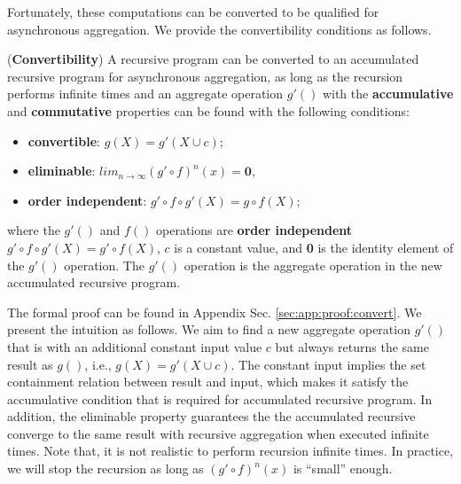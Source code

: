 Fortunately, these computations can be converted to be qualified for asynchronous aggregation. We provide the convertibility conditions as follows.

\begin{theorem}
	\label{th:convert}
	(\textbf{Convertibility}) A recursive program can be converted to an accumulated recursive program for asynchronous aggregation, as long as the recursion performs infinite times and an aggregate operation $g'()$ with the \textbf{accumulative} and \textbf{commutative} properties can be found with the following conditions:
	\begin{itemize}
		\item \textbf{convertible}: $g(X)=g'(X\cup c)$;
		\item \textbf{eliminable}: $lim_{n\rightarrow\infty}(g'\circ f)^n(x)=\textbf{0}$,
\item \textbf{order independent}: $g'\circ f\circ g'(X)=g\circ f(X)$;
	\end{itemize}
	where the $g'()$ and $f()$ operations are \textbf{order independent} $g'\circ f\circ g'(X)=g'\circ f(X)$, $c$ is a constant value, and \textbf{0} is the identity element of the $g'()$ operation. The $g'()$ operation is the aggregate operation in the new accumulated recursive program.
\end{theorem}

The formal proof can be found in Appendix Sec. \ref{sec:app:proof:convert}. We present the intuition as follows. We aim to find a new aggregate operation $g'()$ that is with an additional constant input value $c$ but always returns the same result as $g()$, i.e., $g(X)=g'(X\cup c)$. The constant input implies the set containment relation between result and input, which makes it satisfy the %
accumulative condition that is required for accumulated recursive program. In addition, the eliminable property guarantees the %
the accumulated recursive converge to the same result with recursive aggregation when executed infinite times.%
Note that, it is not realistic to perform recursion infinite times. In practice, we will stop the recursion as long as $(g'\circ f)^n(x)$ is ``small'' enough.

